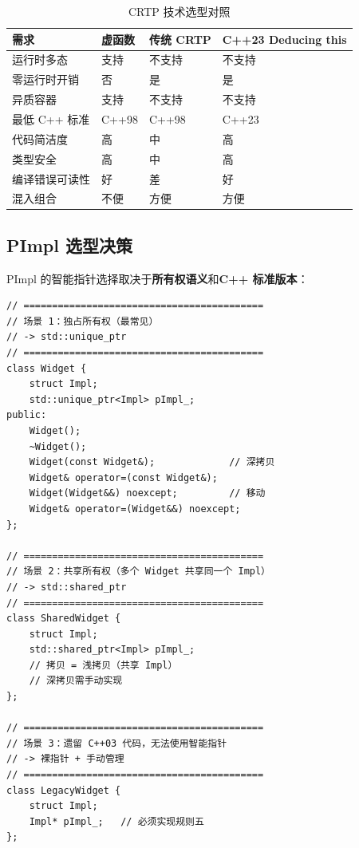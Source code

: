 \documentclass[12pt,a4paper,fontset=fandol]{ctexbook}
\begin{document}
\begin{table}[ht]
\centering
\caption{CRTP 技术选型对照}
\label{tab:crtp-decision}
\begin{tabular}{@{}llll@{}}
\toprule
\textbf{需求} & \textbf{虚函数} & \textbf{传统 CRTP} & \textbf{C++23 Deducing this} \\
\midrule
运行时多态         & 支持     & 不支持   & 不支持   \\
零运行时开销       & 否       & 是       & 是       \\
异质容器           & 支持     & 不支持   & 不支持   \\
最低 C++ 标准      & C++98    & C++98    & C++23    \\
代码简洁度         & 高       & 中       & 高       \\
类型安全           & 高       & 中       & 高       \\
编译错误可读性     & 好       & 差       & 好       \\
混入组合           & 不便     & 方便     & 方便     \\
\bottomrule
\end{tabular}
\end{table}

\subsection{PImpl 选型决策}

PImpl 的智能指针选择取决于\textbf{所有权语义}和\textbf{C++ 标准版本}：

\begin{lstlisting}[caption={决策参考：PImpl 指针类型选择}]
// ==========================================
// 场景 1：独占所有权（最常见）
// -> std::unique_ptr
// ==========================================
class Widget {
    struct Impl;
    std::unique_ptr<Impl> pImpl_;
public:
    Widget();
    ~Widget();
    Widget(const Widget&);             // 深拷贝
    Widget& operator=(const Widget&);
    Widget(Widget&&) noexcept;         // 移动
    Widget& operator=(Widget&&) noexcept;
};

// ==========================================
// 场景 2：共享所有权（多个 Widget 共享同一个 Impl）
// -> std::shared_ptr
// ==========================================
class SharedWidget {
    struct Impl;
    std::shared_ptr<Impl> pImpl_;
    // 拷贝 = 浅拷贝（共享 Impl）
    // 深拷贝需手动实现
};

// ==========================================
// 场景 3：遗留 C++03 代码，无法使用智能指针
// -> 裸指针 + 手动管理
// ==========================================
class LegacyWidget {
    struct Impl;
    Impl* pImpl_;   // 必须实现规则五
};
\end{lstlisting}
\end{document}
